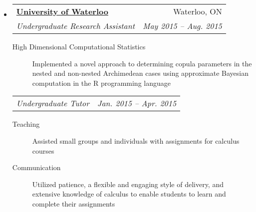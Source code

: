 \documentclass[letterpaper,11pt]{article}
\makeatletter
\newcommand{\resitem}[4]{\begin{tabular*}{17.5cm}{l@{\extracolsep{\fill}}r} \textbf{#1} & #2 \\ \textit{#3} & \textit{#4} \\ \end{tabular*} \vspace{-6pt}}
\newcommand{\ressubitem}[2]{\begin{tabular*}{17.5cm}{l@{\extracolsep{\fill}}r} \textit{#1} & \textit{#2} \\ \end{tabular*} \vspace{-6pt}}
\makeatother
\begin{document}
\begin{itemize}
{\begin{description}
			\end{description}}
\item
	\resitem{\href{https://uwaterloo.ca/}{University of Waterloo}}{Waterloo, ON}{Undergraduate Research Assistant}{May 2015 -- Aug. 2015}
		{\footnotesize \begin{description}
				\item[High Dimensional Computational Statistics] Implemented a novel approach to determining copula parameters in the nested and non-nested Archimedean cases using approximate Bayesian computation in the R programming language
			\end{description}\vspace{-4pt}}
	\ressubitem{Undergraduate Tutor}{Jan. 2015 -- Apr. 2015}
		{\footnotesize \begin{description}
				\item[Teaching] Assisted small groups and individuals with assignments for calculus courses
				\item[Communication] Utilized patience, a flexible and engaging style of delivery, and extensive knowledge of calculus to enable students to learn and complete their assignments
			\end{description}}
\begin{comment}
\item
	\resitem{\href{https://www.bloomberg.com/research/stocks/private/snapshot.asp?privcapId=71456863}{Lightstream Resources Ltd.}}{Calgary, AB}{Exploitation Engineering Summer Student}{May 2014 -- Aug. 2014}
		{\footnotesize \begin{description}
				\item[Upstream Oil and Gas] Collected, organized, and analyzed, data in support of the analysis of drilling completions, fracturing, and production in the Saskatchewan Bakken operating area
				\item[Communication] {Identified data patterns that proved valuable in the future play development of Mississippian wells, presented and discussed findings with department technical and leadership staff}
			\end{description}}
\item
	\resitem{\href{http://trailswesthockey.com/}{Trails West Hockey Association}}{Calgary, AB}{On-Ice Official}{Sept. 2011 -- Mar. 2013}
		{\footnotesize \begin{description}
				\item[Teamwork and Leadership] Acted as both a linesman and a head referee for minor hockey games at the atom and peewee level, utilizing situational awareness, confidence in calls, memory of regulations, and initiative

\end{comment}
\end{itemize}
\end{document}
